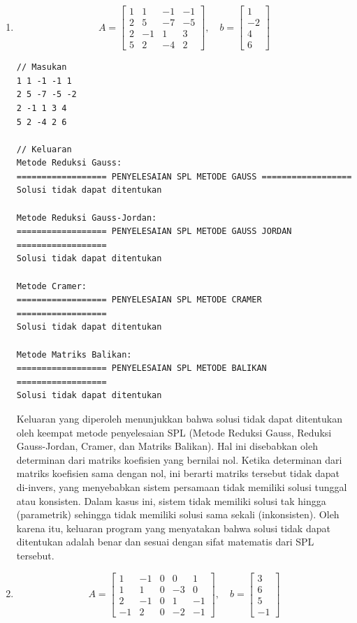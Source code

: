 \begin{enumerate}[label=(\alph*)]
    \item
    \[A = \begin{bmatrix}
    1 & 1 & -1 & -1 \\
    2 & 5 & -7 & -5 \\
    2 & -1 & 1 & 3 \\
    5 & 2 & -4 & 2
\end{bmatrix}, \quad b = 
\begin{bmatrix}
    1 \\ -2 \\ 4 \\ 6
\end{bmatrix}\]

    \begin{lstlisting}[caption = spl-1a.txt]
// Masukan
1 1 -1 -1 1
2 5 -7 -5 -2
2 -1 1 3 4
5 2 -4 2 6

// Keluaran
Metode Reduksi Gauss:
================== PENYELESAIAN SPL METODE GAUSS ==================
Solusi tidak dapat ditentukan

Metode Reduksi Gauss-Jordan:
================== PENYELESAIAN SPL METODE GAUSS JORDAN ==================
Solusi tidak dapat ditentukan

Metode Cramer:
================== PENYELESAIAN SPL METODE CRAMER ==================
Solusi tidak dapat ditentukan

Metode Matriks Balikan:
================== PENYELESAIAN SPL METODE BALIKAN ==================
Solusi tidak dapat ditentukan\end{lstlisting}

Keluaran yang diperoleh menunjukkan bahwa solusi tidak dapat ditentukan oleh keempat metode penyelesaian SPL (Metode Reduksi Gauss, Reduksi Gauss-Jordan, Cramer, dan Matriks Balikan). Hal ini disebabkan oleh determinan dari matriks koefisien yang bernilai nol. Ketika determinan dari matriks koefisien sama dengan nol, ini berarti matriks tersebut tidak dapat di-invers, yang menyebabkan sistem persamaan tidak memiliki solusi tunggal atau konsisten. Dalam kasus ini, sistem tidak memiliki solusi tak hingga (parametrik) sehingga tidak memiliki solusi sama sekali (inkonsisten). Oleh karena itu, keluaran program yang menyatakan bahwa solusi tidak dapat ditentukan adalah benar dan sesuai dengan sifat matematis dari SPL tersebut.

\pagebreak
    \item
    \[ A = \begin{bmatrix}
    1 & -1 & 0 & 0 & 1 \\
    1 & 1 & 0 & -3 & 0 \\
    2 & -1 & 0 & 1 & -1 \\
    -1 & 2 & 0 & -2 & -1
\end{bmatrix}, \quad b =
\begin{bmatrix}
    3 \\ 6 \\ 5 \\ -1
\end{bmatrix}\]


\end{enumerate}
